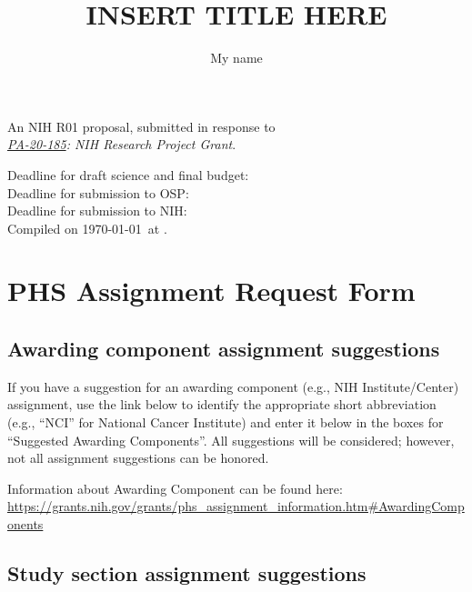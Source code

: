 \documentclass[12pt]{article}
\title{INSERT TITLE HERE}
\author[1]{My name}
\affil[1]{My affiliation}
\date{}
\newcommand{\instructions}[1]{}
\renewcommand{\instructions}[1]{{\scriptsize \sc #1}}
\begin{document}
\maketitle

\begin{center}
An NIH R01 proposal, submitted in response to \\
{\em \href{https://grants.nih.gov/grants/guide/pa-files/PA-20-185.html}{PA-20-185}: NIH Research Project Grant}.
\end{center}

\vfill

\noindent
Deadline for draft science and final budget: \\
Deadline for submission to OSP: \\
Deadline for submission to NIH: \\

{\scriptsize Compiled on \today\ at \currenttime.}

\maketitle

\clearpage
\section*{PHS Assignment Request Form}

\subsection*{Awarding component assignment suggestions}

\instructions{If you have a suggestion for an awarding component (e.g., NIH Institute/Center) assignment, use the link below to identify the appropriate short abbreviation (e.g., ``NCI'' for National
  Cancer Institute) and enter it below in the boxes for ``Suggested Awarding Components''. All suggestions will be considered; however, not all assignment suggestions can be honored.

  Information about Awarding Component can be found here: \url{https://grants.nih.gov/grants/phs_assignment_information.htm\#AwardingComponents}}

\subsection*{Study section assignment suggestions}
\end{document}
